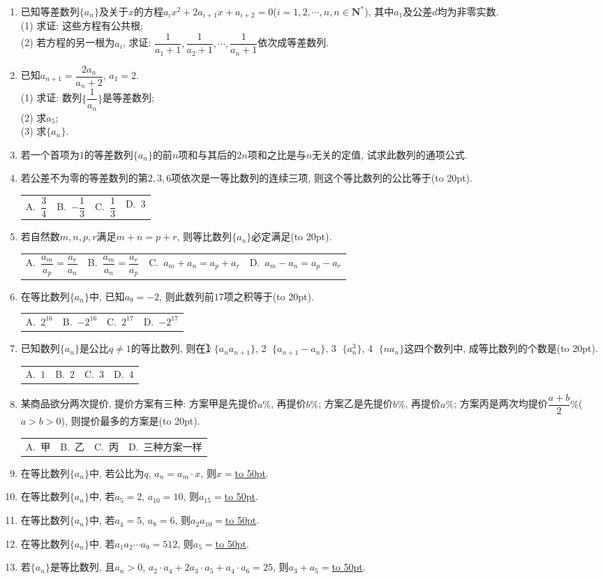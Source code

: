\documentclass[10pt,a4paper]{article}
\newcommand{\blank}[1]{\underline{\hbox to #1pt{}}}
\newcommand{\bracket}[1]{(\hbox to #1pt{})}
\newcommand{\fourch}[4]{\par\begin{tabular}{p{.23\textwidth}p{.23\textwidth}p{.23\textwidth}p{.23\textwidth}}
A.~#1 &B.~#2& C.~#3& D.~#4
\end{tabular}}
\begin{document}
\begin{enumerate}[1.]
\item 已知等差数列$\{a_n\}$及关于$x$的方程$a_ix^2+2a_{i+1}x+a_{i+2}=0$($i=1,2,\cdots ,n,n\in \mathbf{N}^*$), 其中$a_1$及公差$d$均为非零实数.\\
(1) 求证: 这些方程有公共根;\\
(2) 若方程的另一根为$a_i$, 求证: $\dfrac 1{a_1+1},\dfrac 1{a_2+1},\cdots,\dfrac 1{a_n+1}$依次成等差数列.
\item 已知$a_{n+1}=\dfrac{2{a_n}}{{a_n}+2}$, $a_1=2$.\\
(1) 求证: 数列$\{\dfrac 1{a_n}\}$是等差数列;\\
(2) 求$a_5$;\\
(3) 求$\{a_n\}$.
\item 若一个首项为$1$的等差数列$\{a_n\}$的前$n$项和与其后的$2n$项和之比是与$n$无关的定值, 试求此数列的通项公式.
\item 若公差不为零的等差数列的第$2, 3, 6$项依次是一等比数列的连续三项, 则这个等比数列的公比等于\bracket{20}.
\fourch{$\dfrac 34$}{$-\dfrac 13$}{$\dfrac 13$}{$3$}
\item 若自然数$m,n,p,r$满足$m+n=p+r$, 则等比数列$\{a_n\}$必定满足\bracket{20}.
\fourch{$\dfrac{a_m}{a_p}=\dfrac{a_r}{a_n}$}{$\dfrac{a_m}{a_n}=\dfrac{a_r}{a_p}$}{$a_m+a_n=a_p+a_r$}{$a_m-a_n=a_p-a_r$}
\item 在等比数列$\{a_n\}$中, 已知$a_9=-2$, 则此数列前$17$项之积等于\bracket{20}.
\fourch{$2^{16}$}{$-2^{16}$}{$2^{17}$}{$-2^{17}$}
\item 已知数列$\{a_n\}$是公比$q\ne 1$的等比数列, 则在\textcircled{1} $\{a_na_{n+1}\}$, \textcircled{2} $\{a_{n+1}-a_n\}$, \textcircled{3} $\{a_n^3\}$, \textcircled{4} $\{na_n\}$这四个数列中, 成等比数列的个数是\bracket{20}.
\fourch{$1$}{$2$}{$3$}{$4$}
\item 某商品欲分两次提价, 提价方案有三种: 方案甲是先提价$a\%$, 再提价$b\%$; 方案乙是先提价$b\%$, 再提价$a\%$; 方案丙是两次均提价$\dfrac{a+b}2\%$($a>b>0$), 则提价最多的方案是\bracket{20}.
\fourch{甲}{乙}{丙}{三种方案一样}
\item 在等比数列$\{a_n\}$中, 若公比为$q$, $a_n=a_m\cdot x$, 则$x=$\blank{50}.
\item 在等比数列$\{a_n\}$中, 若$a_5=2$, $a_{10}=10$, 则$a_{15}=$\blank{50}.
\item 在等比数列$\{a_n\}$中, 若$a_4=5$, $a_8=6$, 则$a_2a_{10}=$\blank{50}.
\item 在等比数列$\{a_n\}$中, 若$a_1a_2\cdots a_9=512$, 则$a_5=$\blank{50}.
\item 若$\{a_n\}$是等比数列, 且$a_n>0$, $a_2\cdot a_4+2a_3\cdot a_5+a_4\cdot a_6=25$, 则$a_3+a_5=$\blank{50}.

\end{enumerate}
\end{document}
